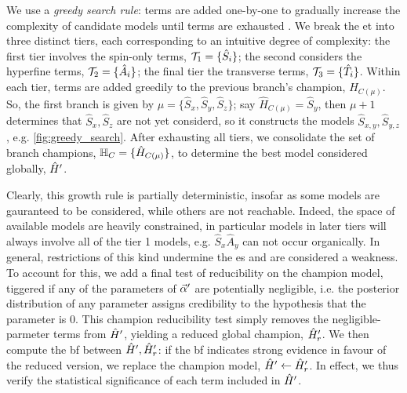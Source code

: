 We use a \emph{greedy search rule}: 
    terms are added one-by-one to gradually increase the complexity of candidate models until terms are exhausted \cite{russell2002artificial}.  
We break the \gls{et} into three distinct tiers, each corresponding to an intuitive degree of complexity:
    the first tier involves the spin-only terms, $\mathcal{T}_1 = \{ \hat{S}_i \}$; 
    the second considers the hyperfine terms, $\mathcal{T}_2 = \{ \hat{A}_i \}$;
    the final tier the transverse terms, $\mathcal{T}_3 = \{ \hat{T}_i\}$.  
Within each tier, terms are added greedily to the previous branch's champion, $\hat{H}_{C(\mu)}$.
So, the first branch is given by $\mu = \{ \hat{S}_x, \hat{S}_y, \hat{S}_z\}$;
    say $\hat{H}_{C(\mu)} = \hat{S}_y$, then $\mu + 1$  determines that $\hat{S}_x, \hat{S}_z$ 
    are not yet considerd, so it constructs the models $\hat{S}_{x,y}, \hat{S}_{y,z}$, e.g. \cref{fig:greedy_search}. 
After exhausting all tiers, we consolidate the set of branch champions, $\mathbb{H}_C = \{ \hat{H}_{C(\mu)}\}$, 
    to determine the best model considered globally, $\hat{H}^{\prime}$.  
\par 

Clearly, this growth rule is partially deterministic, insofar as some models are gauranteed to be considered, 
    while others are not reachable.
Indeed, the space of available models are heavily constrained, in particular models in later tiers will 
    always involve all of the tier 1 models, e.g. $\hat{S}_{x}\hat{A}_{y}$ can not occur organically. 
In general, restrictions of this kind undermine the \gls{es} and are considered a weakness.
To account for this, we add a final test of reducibility on the champion model, 
    tiggered if any of the parameters of $\vec{\alpha}^{\prime}$ are potentially negligible, 
    i.e. the posterior distribution of any parameter assigns credibility to the hypothesis that the parameter is 0.
This champion reducibility test simply removes the negligible-parmeter terms from $\hat{H}^{\prime}$, 
    yielding a reduced global champion, $\hat{H}^{\prime}_r$.
We then compute the \gls{bf} between $\hat{H}^{\prime}, \hat{H}^{\prime}_r$: 
    if the \gls{bf} indicates strong evidence in favour of the reduced version, 
    we replace the \gls{champion model}, $\hat{H}^{\prime} \gets \hat{H}^{\prime}_r$. 
In effect, we thus verify the statistical significance of each term included in $\hat{H}^{\prime}$. 
\par 

